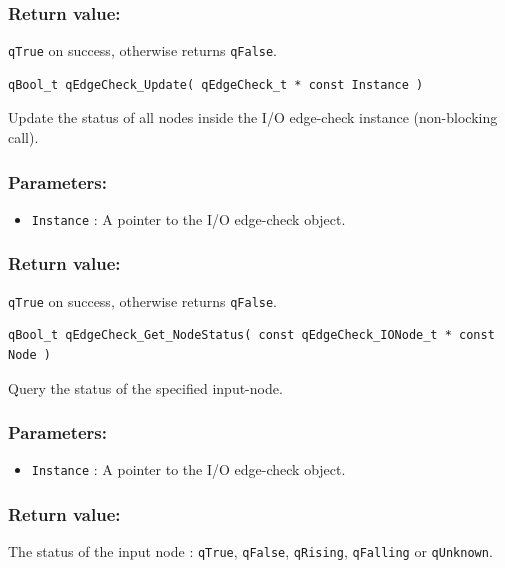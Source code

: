 \documentclass{article}
\begin{document}
\subsubsection*{Return value:}
\lstinline{qTrue} on success, otherwise returns \lstinline{qFalse}.


\noindent\hrulefill

\begin{lstlisting}[style=CStyle]
qBool_t qEdgeCheck_Update( qEdgeCheck_t * const Instance )
\end{lstlisting}

Update the status of all nodes inside the I/O edge-check instance (non-blocking call). 

\subsubsection*{Parameters:}
\begin{itemize}
    \item \lstinline{Instance} : A pointer to the I/O edge-check object.
\end{itemize}

\subsubsection*{Return value:}
\lstinline{qTrue} on success, otherwise returns \lstinline{qFalse}.


\noindent\hrulefill

\begin{lstlisting}[style=CStyle]
qBool_t qEdgeCheck_Get_NodeStatus( const qEdgeCheck_IONode_t * const Node )
\end{lstlisting}

Query the status of the specified input-node. 

\subsubsection*{Parameters:}
\begin{itemize}
    \item \lstinline{Instance} : A pointer to the I/O edge-check object.
\end{itemize}

\subsubsection*{Return value:}
The status of the input node : \lstinline{qTrue}, \lstinline{qFalse}, \lstinline{qRising}, \lstinline{qFalling} or \lstinline{qUnknown}.
\end{document}

